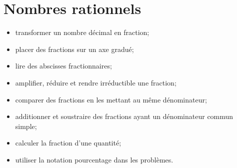 \chapter{Nombres rationnels}\label{ChNombresRationnels}

\vspace{5cm}
\begin{acquis}
\begin{itemize}
\item transformer un nombre décimal en fraction;
\item placer des fractions sur un axe gradué;
\item lire des abscisses fractionnaires;
\item amplifier, réduire et rendre irréductible une fraction;
\item comparer des fractions en les mettant au même dénominateur;
\item additionner et soustraire des fractions ayant un dénominateur commun simple;
\item calculer la fraction d'une quantité;
\item utiliser la notation pourcentage dans les problèmes.
\end{itemize}
\end{acquis}


\activites



\cours


\exercicesbase
\begin{colonne*exercice}

\end{colonne*exercice}


\exercicesappr
\begin{colonne*exercice}

\end{colonne*exercice}

\connaissances


\TravauxPratiques %


\pagebreak

%


